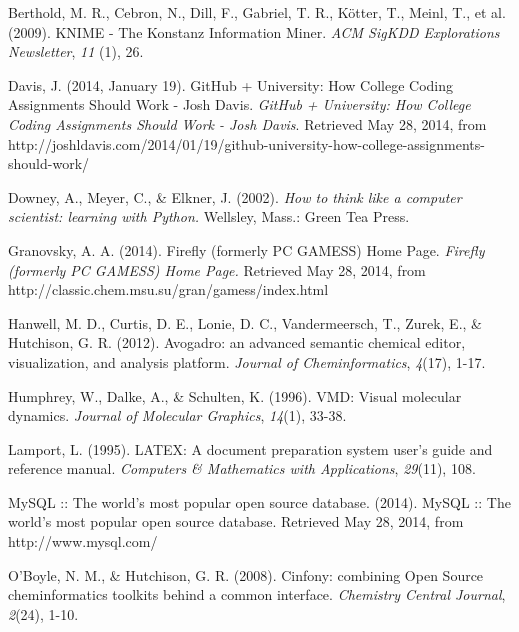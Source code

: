 \documentclass[10pt,letterpaper]{article}
\begin{document}
\begin{thebibliography}{99}

 Berthold, M. R., Cebron, N., Dill, F., Gabriel, T. R., K\"otter, T., Meinl, T., et al. (2009).
 KNIME - The Konstanz Information Miner.
 \textit{ACM SigKDD Explorations Newsletter},
 \textit{11} (1),
 26.

 Davis, J. (2014, January 19).
 GitHub + University: How College Coding Assignments Should Work - Josh Davis.
 \textit{GitHub + University: How College Coding Assignments Should Work - Josh Davis}.
 Retrieved May 28, 2014, from {\footnotesize http://joshldavis.com/2014/01/19/github-university-how-college-assignments-should-work/}

 Downey, A., Meyer, C., \& Elkner, J. (2002).
 \textit{How to think like a computer scientist: learning with Python.}
 Wellsley, Mass.:
 Green Tea Press.

 Granovsky, A. A. (2014).
 Firefly (formerly PC GAMESS) Home Page.
 \textit{Firefly (formerly PC GAMESS) Home Page.}
 Retrieved May 28, 2014, from {\footnotesize http://classic.chem.msu.su/gran/gamess/index.html}

 Hanwell, M. D., Curtis, D. E., Lonie, D. C., Vandermeersch, T., Zurek, E., \& Hutchison, G. R. (2012).
 Avogadro: an advanced semantic chemical editor, visualization, and analysis platform.
 \textit{Journal of Cheminformatics},
 \textit{4}(17),
 1-17.

 Humphrey, W., Dalke, A., \& Schulten, K. (1996).
 VMD: Visual molecular dynamics.
 \textit{Journal of Molecular Graphics},
 \textit{14}(1),
 33-38.

 Lamport, L. (1995).
 LATEX: A document preparation system user's guide and reference manual.
 \textit{Computers \& Mathematics with Applications},
 \textit{29}(11),
 108.

 MySQL :: The world's most popular open source database. (2014).
 MySQL :: The world's most popular open source database.
 Retrieved May 28, 2014, from {\footnotesize http://www.mysql.com/}

 O'Boyle, N. M., \& Hutchison, G. R. (2008).
 Cinfony: combining Open Source cheminformatics toolkits behind a common interface.
 \textit{Chemistry Central Journal},
 \textit{2}(24),
 1-10.


\end{thebibliography}
\end{document}
